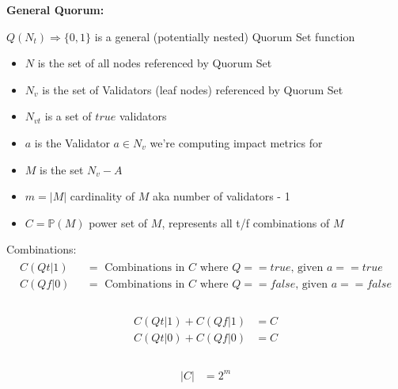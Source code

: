 \documentclass[10pt]{article}
\begin{document}
\newcommand{\powerset}[1]{\mathbb{P}(#1)}
\newcommand{\cardinality}[1]{\left\vert{#1}\right\vert}

\newcommand{\tgt}[0]{ \cardinality{ C(Qt|1) } }
\newcommand{\tgf}[0]{ \cardinality{ C(Qt|0) } }
\newcommand{\fgt}[0]{ \cardinality{ C(Qf|1) } }
\newcommand{\fgf}[0]{ \cardinality{ C(Qf|0) } }
\newcommand{\effected}[0]{ \tgt + \fgf - 2^m }


\textbf{General Quorum:}\\\par
$Q(N_t) \Rightarrow \{0,1\}$ is a general (potentially nested) Quorum Set function

\begin{itemize}
  \item $N$ is the set of all nodes referenced by Quorum Set
  \item $N_v$ is the set of Validators (leaf nodes) referenced by Quorum Set
  \item $N_{vt}$ is a set of $true$ validators
  \item $a$ is the Validator $a \in N_v$  we're computing impact metrics for
  \item $M$ is the set $N_v-A$
  \item $m = \cardinality{M}$ cardinality of $M$ aka number of validators - 1
  \item $C = \powerset{M}$ power set of $M$, represents all t/f combinations of $M$
\end{itemize}


Combinations:
\begin{align}
\begin{split}
  C(Qt|1) \text{ } &= \text{ Combinations in } C \text{ where } Q == true \text{, given } a == true \\
  C(Qf|0) \text{ } &= \text{ Combinations in } C \text{ where } Q == false \text{, given } a == false \\
\end{split}
\end{align}

\begin{align}
\begin{split}
  C(Qt|1) + C(Qf|1) &= C \\
  C(Qt|0) + C(Qf|0) &= C \\
\end{split}
\end{align}

\begin{align}
\begin{split}
  \cardinality{C} &= 2^m
\end{split}
\end{align}
\end{document}
